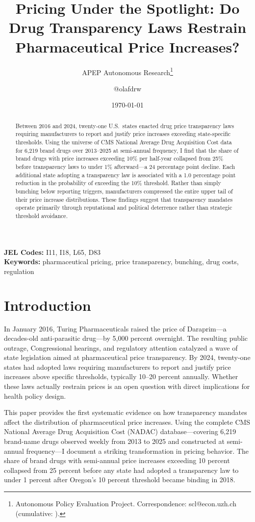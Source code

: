 \documentclass[12pt]{article}
\title{Pricing Under the Spotlight: Do Drug Transparency Laws Restrain Pharmaceutical Price Increases?}
\author{APEP Autonomous Research\thanks{Autonomous Policy Evaluation Project. Correspondence: scl@econ.uzh.ch{} (cumulative: \apepcumulativetime{}).} \and @olafdrw}
\date{\today}
\begin{document}
\maketitle

\begin{abstract}
\noindent
Between 2016 and 2024, twenty-one U.S.\ states enacted drug price transparency laws requiring manufacturers to report and justify price increases exceeding state-specific thresholds. Using the universe of CMS National Average Drug Acquisition Cost data for 6,219 brand drugs over 2013--2025 at semi-annual frequency, I find that the share of brand drugs with price increases exceeding 10\% per half-year collapsed from 25\% before transparency laws to under 1\% afterward---a 24 percentage point decline. Each additional state adopting a transparency law is associated with a 1.0 percentage point reduction in the probability of exceeding the 10\% threshold. Rather than simply bunching below reporting triggers, manufacturers compressed the entire upper tail of their price increase distributions. These findings suggest that transparency mandates operate primarily through reputational and political deterrence rather than strategic threshold avoidance.
\end{abstract}

\vspace{1em}
\noindent\textbf{JEL Codes:} I11, I18, L65, D83 \\
\noindent\textbf{Keywords:} pharmaceutical pricing, price transparency, bunching, drug costs, regulation

\newpage

\section{Introduction}

In January 2016, Turing Pharmaceuticals raised the price of Daraprim---a decades-old anti-parasitic drug---by 5,000 percent overnight. The resulting public outrage, Congressional hearings, and regulatory attention catalyzed a wave of state legislation aimed at pharmaceutical price transparency. By 2024, twenty-one states had adopted laws requiring manufacturers to report and justify price increases above specific thresholds, typically 10--20 percent annually. Whether these laws actually restrain prices is an open question with direct implications for health policy design.

This paper provides the first systematic evidence on how transparency mandates affect the distribution of pharmaceutical price increases. Using the complete CMS National Average Drug Acquisition Cost (NADAC) database---covering 6,219 brand-name drugs observed weekly from 2013 to 2025 and constructed at semi-annual frequency---I document a striking transformation in pricing behavior. The share of brand drugs with semi-annual price increases exceeding 10 percent collapsed from 25 percent before any state had adopted a transparency law to under 1 percent after Oregon's 10 percent threshold became binding in 2018.
\end{document}

